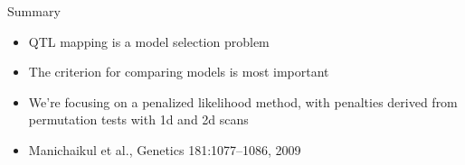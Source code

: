 \documentclass[12pt]{article}
\newcommand{\headsize}{\fontsize{35}{35} \selectfont}
\newcommand{\smallersize}{\fontsize{20}{25} \selectfont}
\begin{document}
\newpage

\headsize \color{myyellow}
\hfill \begin{minipage}{5.75in}
\centering
Summary
\end{minipage}

\vspace{3cm} \color{mywhite} \smallersize

\hfill \begin{minipage}{9.5in}

\begin{itemize}
\itemsep24pt
\item QTL mapping is a model selection problem
\item The criterion for comparing models is most important
\item We're focusing on a penalized likelihood method, with penalties
  derived from permutation tests with 1d and 2d scans
\item Manichaikul et al., Genetics 181:1077--1086, 2009
\end{itemize}

\end{minipage} \hspace{0.5in}
\end{document}
